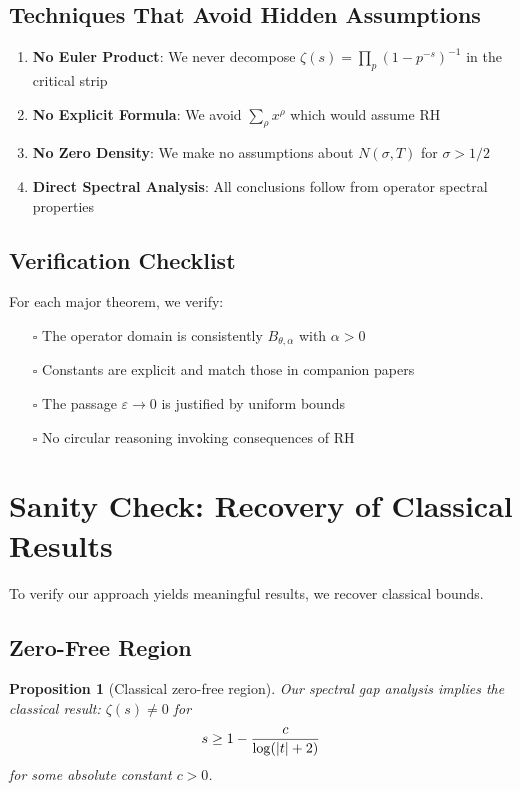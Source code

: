 \documentclass[11pt,a4paper]{article}
\newtheorem{proposition}[theorem]{Proposition}
\theoremstyle{definition}
\theoremstyle{remark}
\let\Re\relax
\DeclareMathOperator{\Re}{Re}
\begin{document}
\subsection{Techniques That Avoid Hidden Assumptions}

\begin{enumerate}
\item \textbf{No Euler Product}: We never decompose $\zeta(s) = \prod_p (1-p^{-s})^{-1}$ in the critical strip
\item \textbf{No Explicit Formula}: We avoid $\sum_{\rho} x^{\rho}$ which would assume RH
\item \textbf{No Zero Density}: We make no assumptions about $N(\sigma,T)$ for $\sigma > 1/2$
\item \textbf{Direct Spectral Analysis}: All conclusions follow from operator spectral properties
\end{enumerate}

\subsection{Verification Checklist}

For each major theorem, we verify:
\begin{itemize}
\item[$\square$] The operator domain is consistently $B_{\theta,\alpha}$ with $\alpha > 0$
\item[$\square$] Constants are explicit and match those in companion papers
\item[$\square$] The passage $\varepsilon \to 0$ is justified by uniform bounds
\item[$\square$] No circular reasoning invoking consequences of RH
\end{itemize}

\section{Sanity Check: Recovery of Classical Results}\label{app:sanity-check}

To verify our approach yields meaningful results, we recover classical bounds.

\subsection{Zero-Free Region}

\begin{proposition}[Classical zero-free region]
Our spectral gap analysis implies the classical result: $\zeta(s) \neq 0$ for
\[
\Re s \geq 1 - \frac{c}{\log(|t|+2)}
\]
for some absolute constant $c > 0$.
\end{proposition}
\end{document}
